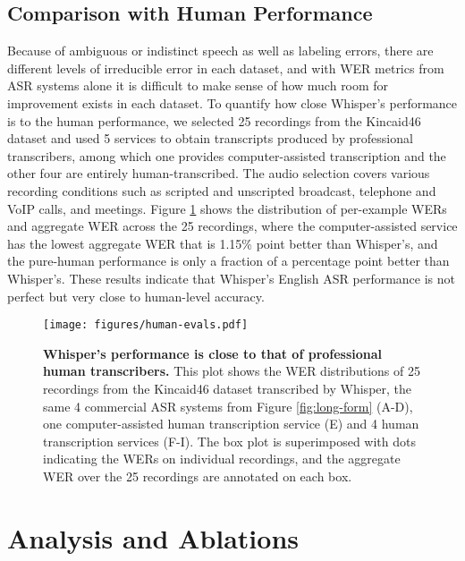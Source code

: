 \documentclass[nohyperref]{article}
\theoremstyle{plain}
\theoremstyle{definition}
\theoremstyle{remark}
\begin{document}
\subsection{Comparison with Human Performance}\label{subsec:human-comparison}

Because of ambiguous or indistinct speech as well as labeling errors, there are different levels of irreducible error in each dataset, and with WER metrics from ASR systems alone it is difficult to make sense of how much room for improvement exists in each dataset. To quantify how close Whisper's performance is to the human performance, we selected 25 recordings from the Kincaid46 dataset and used 5 services to obtain transcripts produced by professional transcribers, among which one provides computer-assisted transcription and the other four are entirely human-transcribed. The audio selection covers various recording conditions such as scripted and unscripted broadcast, telephone and VoIP calls, and meetings. Figure \ref{fig:human-evals} shows the distribution of per-example WERs and aggregate WER across the 25 recordings, where the computer-assisted service has the lowest aggregate WER that is 1.15\% point better than Whisper's, and the pure-human performance is only a fraction of a percentage point better than Whisper's. These results indicate that Whisper's English ASR performance is not perfect but very close to human-level accuracy.



\begin{figure}[t]
\begin{center}
\centerline{\texttt{[image: figures/human-evals.pdf]}}
\caption{\textbf{Whisper's performance is close to that of professional human transcribers.} This plot shows the WER distributions of 25 recordings from the Kincaid46 dataset transcribed by Whisper, the same 4 commercial ASR systems from Figure \ref{fig:long-form} (A-D), one computer-assisted human transcription service (E) and 4 human transcription services (F-I). The box plot is superimposed with dots indicating the WERs on individual recordings, and the aggregate WER over the 25 recordings are annotated on each box.}
\label{fig:human-evals}
\end{center}
\vspace{-1em}
\end{figure}

\section{Analysis and Ablations}\label{sec:ablation}
\end{document}
